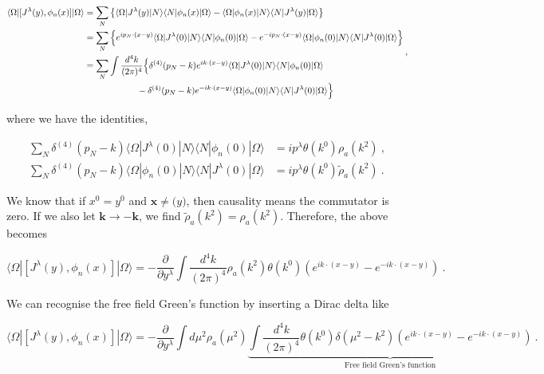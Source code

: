\documentclass[10pt,twoside]{report}
\begin{document}
	\begin{align}
		\begin{split}
		\langle\Omega|[J^\lambda(y),\phi_n(x)]|\Omega\rangle &= \sum_N \left\{\langle\Omega|J^\lambda(y)|N\rangle\langle N|\phi_n(x)|\Omega\rangle - \langle\Omega|\phi_n(x)|N\rangle\langle N|J^\lambda(y)|\Omega\rangle\right\}  \\ 
		&= \sum_N \left\{e^{ip_N\cdot(x-y)}\langle\Omega|J^\lambda(0)|N\rangle\langle N|\phi_n(0)|\Omega\rangle - e^{-ip_N\cdot(x-y)}\langle\Omega|\phi_n(0)|N\rangle\langle N|J^\lambda(0)|\Omega\rangle \right\} \\
		&= \sum_N\int\frac{d^4k}{(2\pi)^4}\Big\{ \delta^{(4)}(p_N-k)e^{ik\cdot(x-y)}\langle\Omega|J^\lambda(0)|N\rangle\langle N|\phi_n(0)|\Omega\rangle\\
		&\hspace{2.1cm}
		 - \delta^{(4)}(p_N-k)e^{-ik\cdot(x-y)}\langle\Omega|\phi_n(0)|N\rangle\langle N|J^\lambda(0)|\Omega\rangle \Big\}\\
		\end{split} \:,
		\label{ChPT | eq | "vacuum exp val"}
	\end{align}
	
	where we have the identities,
	
	\begin{align}
		\sum_N\delta^{(4)}(p_N-k)\langle\Omega|J^\lambda(0)|N\rangle\langle N|\phi_n(0)|\Omega\rangle &= ip^\lambda\theta(k^0)\rho_a(k^2) \label{ChPtTh | eq | "intermediate eq 1"} \:,\\
		\sum_N\delta^{(4)}(p_N-k)\langle\Omega|\phi_n(0)|N\rangle\langle N|J^\lambda(0)|\Omega\rangle &= ip^\lambda\theta(k^0)\tilde{\rho}_a(k^2) \:.
	\end{align}
	
	We know that if $x^0 = y^0$ and $\bm{x} \neq \bm(y)$, then causality means the commutator is zero. If we also let $\bm{k}\rightarrow -\bm{k}$, we find $\tilde{\rho}_a(k^2) = \rho_a(k^2)$. Therefore, the above becomes
	
	\begin{equation}
		\langle\Omega|[J^\lambda(y),\phi_n(x)]|\Omega\rangle
		= -\frac{\partial}{\partial y^\lambda}\int\frac{d^4k}{(2\pi)^4}\rho_a(k^2)\theta(k^0)\left(e^{ik\cdot(x-y)} - e^{-ik\cdot(x-y)}\right) \:.
	\end{equation} 
	
	We can recognise the free field Green's function by inserting a Dirac delta like
	
	\begin{equation}
	\langle\Omega|[J^\lambda(y),\phi_n(x)]|\Omega\rangle
	= -\frac{\partial}{\partial y^\lambda}\int d\mu^2\rho_a(\mu^2)\underbrace{\int\frac{d^4k}{(2\pi)^4}\theta(k^0)\delta(\mu^2-k^2)\left(e^{ik\cdot(x-y)} - e^{-ik\cdot(x-y)}\right)}_{\text{Free field Green's function}} \:.
	\end{equation}
	
\end{document}
